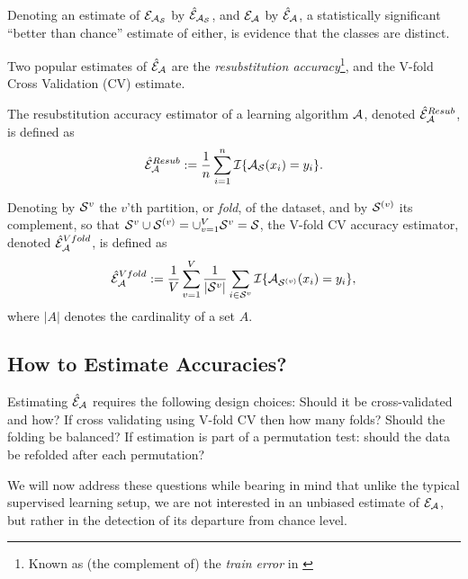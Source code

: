 \documentclass[journal]{IEEEtran}
\begin{document}
Denoting an estimate of $\mathcal{E}_{\mathcal{A}_{\mathcal{S}}}$ by $\hat{\mathcal{E}}_{\mathcal{A}_{\mathcal{S}}}$, and $\mathcal{E}_{\mathcal{A}}$ by $\hat{\mathcal{E}}_{\mathcal{A}}$, a statistically significant ``better than chance'' estimate of either, is evidence that the classes are distinct. 

Two popular estimates of $\hat{\mathcal{E}}_{\mathcal{A}}$ are the \emph{resubstitution accuracy}\footnote{Known as (the complement of) the \emph{train error} in \cite{hastie_elements_2003}}, and the V-fold Cross Validation (CV) estimate.
\begin{definition}
	\label{def:resubstitution}
	The resubstitution accuracy estimator of a learning algorithm $\mathcal{A}$, denoted $\hat{\mathcal{E}}_{\mathcal{A}}^{Resub}$,  is defined as
	\begin{align}
	\hat{\mathcal{E}}_{\mathcal{A}}^{Resub} := \frac 1n \sum_{i=1}^{n} \mathcal{I}{\{ \mathcal{A}_{\mathcal{S}}(x_i)=y_i \}}.
	\end{align}
\end{definition}


\begin{definition}
	\label{def:v-fold}
	Denoting by $\mathcal{S}^{v}$ the $v$'th partition, or \emph{fold}, of the dataset, and by $\mathcal{S}^{(v)}$ its complement, so that $\mathcal{S}^{v} \cup \mathcal{S}^{(v)}=\cup_{v=1}^V \mathcal{S}^{v}=\mathcal{S}$, the V-fold CV accuracy estimator, denoted $\hat{\mathcal{E}}_{\mathcal{A}}^{Vfold}$, is defined as 	
	\begin{align}
	\hat{\mathcal{E}}_{\mathcal{A}}^{Vfold} := 
	\frac 1V \sum_{v=1}^{V} \frac{1}{|\mathcal{S}^v|} \sum_{i \in \mathcal{S}^{v}} \mathcal{I}{\{ \mathcal{A}_{\mathcal{S}^{(v)}}(x_i)=y_i \}},
	\end{align}
	where $|A|$ denotes the cardinality of a set $A$.
\end{definition}




\subsection{How to Estimate Accuracies?}
\label{sec:considerations}

Estimating $\hat{\mathcal{E}}_{\mathcal{A}}$ requires the following design choices: 
Should it be cross-validated and how? 
If cross validating using V-fold CV then how many folds? 
Should the folding be balanced?
If estimation is part of a permutation test: should the data be refolded after each permutation? 

We will now address these questions while bearing in mind that unlike the typical supervised learning setup, we are not interested in an unbiased estimate of $\mathcal{E}_{\mathcal{A}}$, but rather in the detection of its departure from chance level. 
\end{document}
